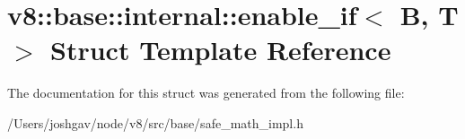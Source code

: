 \hypertarget{structv8_1_1base_1_1internal_1_1enable__if}{}\section{v8\+:\+:base\+:\+:internal\+:\+:enable\+\_\+if$<$ B, T $>$ Struct Template Reference}
\label{structv8_1_1base_1_1internal_1_1enable__if}


The documentation for this struct was generated from the following file\+:\begin{DoxyCompactItemize}
\item 
/\+Users/joshgav/node/v8/src/base/safe\+\_\+math\+\_\+impl.\+h\end{DoxyCompactItemize}
